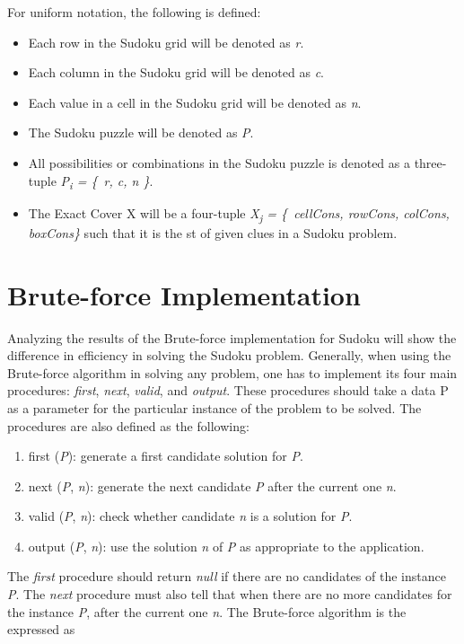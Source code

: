 \documentclass[a4paper,oneside,11pt]{report}
\newcounter{row}
\newcounter{col}
\begin{document}
For uniform notation, the following is defined:
\begin{itemize}
\item Each row in the Sudoku grid will be denoted as \textit{r}.
\item Each column in the Sudoku grid will be denoted as \textit{c}.
\item Each value in a cell in the Sudoku grid will be denoted as \textit{n}.
\item The Sudoku puzzle will be denoted as \textit{P}.
\item All possibilities or combinations in the Sudoku puzzle is denoted as a three-tuple {\itshape P\textsubscript{i} = \{\ r, c, n \}}.
\item The Exact Cover X will be a four-tuple {\itshape X\textsubscript{j} = \{\ cellCons, rowCons, colCons, boxCons\}} such that it is the st of given clues in a Sudoku problem.
\end{itemize}

\section{Brute-force Implementation}
Analyzing the results of the Brute-force implementation for Sudoku will show the difference in efficiency in solving the Sudoku problem. Generally, when using the Brute-force algorithm in solving any problem, one has to implement its four main procedures: \emph{first}, \emph{next}, \emph{valid}, and \emph{output}. These procedures should take a data P as a parameter for the particular instance of the problem to be solved. The procedures are also defined as the following:
\begin{enumerate}
\item first (\emph{P}): generate a first candidate solution for \emph{P}.
\item next (\emph{P}, \emph{n}): generate the next candidate \emph{P} after the current one \emph{n}.
\item valid (\emph{P}, \emph{n}): check whether candidate \emph{n} is a solution for \emph{P}.
\item output (\emph{P}, \emph{n}): use the solution \emph{n} of \emph{P} as appropriate to the application.
\end{enumerate}
The \emph{first} procedure should return \emph{null} if there are no candidates of the instance \emph{P}. The \emph{next} procedure must also tell that when there are no more candidates for the instance \emph{P}, after the current one \emph{n}. The Brute-force algorithm is the expressed as\\
\end{document}

